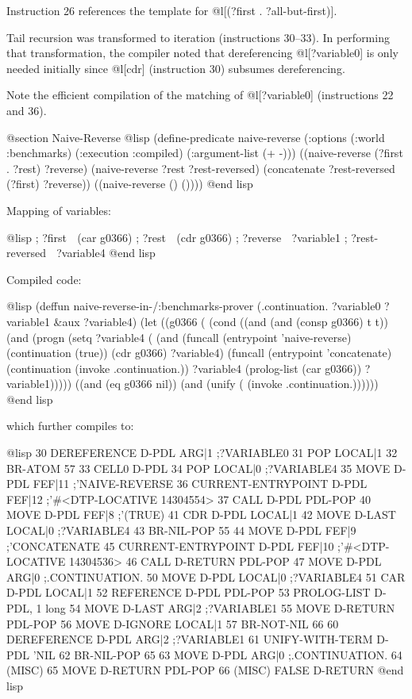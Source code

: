 {Instruction 26 references the template for @l[(?first . ?all-but-first)].

Tail recursion was transformed to iteration (instructions 30--33). In
performing that transformation, the compiler noted that dereferencing
@l[?variable0] is only needed initially since @l[cdr] 
(instruction 30) subsumes dereferencing.

Note the efficient compilation of the matching of @l[?variable0]
(instructions 22 and 36).

@section Naive-Reverse
@lisp
(define-predicate naive-reverse
  (:options (:world :benchmarks) 
            (:execution :compiled) 
            (:argument-list (+ -)))
  ((naive-reverse (?first . ?rest) ?reverse)
   (naive-reverse ?rest ?rest-reversed)
   (concatenate ?rest-reversed (?first) ?reverse))
  ((naive-reverse () ())))
@end lisp

Mapping of variables:

@lisp
; ?first  (car g0366)
; ?rest  (cdr g0366)
; ?reverse  ?variable1
; ?rest-reversed  ?variable4
@end lisp

Compiled code:

@lisp
(deffun naive-reverse-in-/:benchmarks-prover
        (.continuation. ?variable0 ?variable1 &aux ?variable4)
  (let ((g0366 (%
    (cond ((and (and (consp g0366) t t))
           (and
            (progn
             (setq ?variable4 (%
                   (and (funcall (entrypoint 'naive-reverse)
                                 (continuation (true))
                                 (cdr g0366)
                                 ?variable4)
                        (funcall (entrypoint 'concatenate)
                                 (continuation 
                                   (invoke .continuation.))
                                 ?variable4
                                 (prolog-list (car g0366))
                                 ?variable1)))))
          ((and (eq g0366 nil))
           (and (unify (%
                (invoke .continuation.))))))
@end lisp

which further compiles to:

@lisp
30 DEREFERENCE D-PDL ARG|1  ;?VARIABLE0
31 POP LOCAL|1
32 BR-ATOM 57
33 CELL0 D-PDL
34 POP LOCAL|0            ;?VARIABLE4
35 MOVE D-PDL FEF|11      ;'NAIVE-REVERSE
36 CURRENT-ENTRYPOINT D-PDL FEF|12      ;'#<DTP-LOCATIVE 14304554>
37 CALL D-PDL PDL-POP
40 MOVE D-PDL FEF|8       ;'(TRUE)
41 CDR D-PDL LOCAL|1
42 MOVE D-LAST LOCAL|0    ;?VARIABLE4
43 BR-NIL-POP 55
44 MOVE D-PDL FEF|9       ;'CONCATENATE
45 CURRENT-ENTRYPOINT D-PDL FEF|10      ;'#<DTP-LOCATIVE 14304536>
46 CALL D-RETURN PDL-POP
47 MOVE D-PDL ARG|0       ;.CONTINUATION.
50 MOVE D-PDL LOCAL|0     ;?VARIABLE4
51 CAR D-PDL LOCAL|1
52 REFERENCE D-PDL PDL-POP
53 PROLOG-LIST D-PDL, 1 long
54 MOVE D-LAST ARG|2      ;?VARIABLE1
55 MOVE D-RETURN PDL-POP
56 MOVE D-IGNORE LOCAL|1
57 BR-NOT-NIL 66
60 DEREFERENCE D-PDL ARG|2  ;?VARIABLE1
61 UNIFY-WITH-TERM D-PDL 'NIL
62 BR-NIL-POP 65
63 MOVE D-PDL ARG|0       ;.CONTINUATION.
64 (MISC) %
65 MOVE D-RETURN PDL-POP
66 (MISC) FALSE D-RETURN
@end lisp

}
